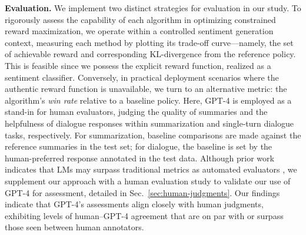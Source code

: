 \textbf{Evaluation.} We implement two distinct strategies for evaluation in our study. To rigorously assess the capability of each algorithm in optimizing constrained reward maximization, we operate within a controlled sentiment generation context, measuring each method by plotting its trade-off curve—namely, the set of achievable reward and corresponding KL-divergence from the reference policy. This is feasible since we possess the explicit reward function, realized as a sentiment classifier. Conversely, in practical deployment scenarios where the authentic reward function is unavailable, we turn to an alternative metric: the algorithm’s \textit{win rate} relative to a baseline policy. Here, GPT-4 is employed as a stand-in for human evaluators, judging the quality of summaries and the helpfulness of dialogue responses within summarization and single-turn dialogue tasks, respectively. For summarization, baseline comparisons are made against the reference summaries in the test set; for dialogue, the baseline is set by the human-preferred response annotated in the test data. Although prior work indicates that LMs may surpass traditional metrics as automated evaluators \citep{Chen2023ExploringTU}, we supplement our approach with a human evaluation study to validate our use of GPT-4 for assessment, detailed in Sec.~\ref{sec:human-judgments}. Our findings indicate that GPT-4’s assessments align closely with human judgments, exhibiting levels of human–GPT-4 agreement that are on par with or surpass those seen between human annotators.

